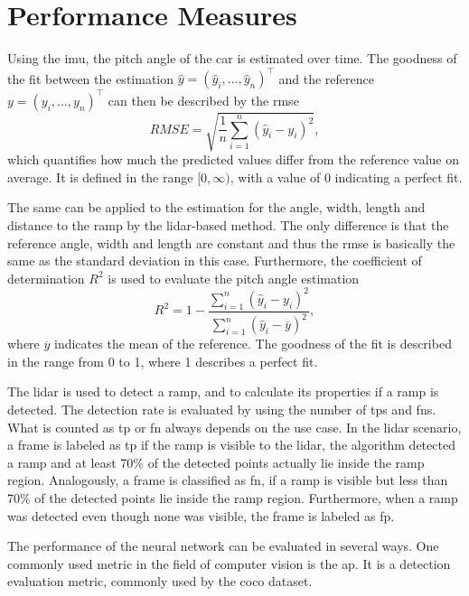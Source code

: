 \section{Performance Measures}
\label{sec:performance_measures}
Using the \gls{imu}, the pitch angle of the car is estimated over time.
The goodness of the fit between the estimation $\hat{y} = (\hat{y}_i, \dots, \hat{y}_n)^\intercal$ and the reference $y = (y_i, \dots, y_n)^\intercal$ can then be described by the \gls{rmse}
\begin{equation}
	RMSE = \sqrt{\frac{1}{n}\sum_{i = 1}^n(\hat{y}_i - y_i)^2},
\end{equation}
which quantifies how much the predicted values differ from the reference value on average.
It is defined in the range $[0, \infty)$, with a value of 0 indicating a perfect fit.\par
The same can be applied to the estimation for the angle, width, length and distance to the ramp by the \gls{lidar}-based method.
The only difference is that the reference angle, width and length are constant and thus the \gls{rmse} is basically the same as the standard deviation in this case.
Furthermore, the coefficient of determination $R^2$ is used to evaluate the pitch angle estimation
\begin{equation}
	R^2 = 1 - \frac{\sum\limits_{i = 1}^n(\hat{y}_i - y_i)^2}{\sum\limits_{i = 1}^n(\hat{y}_i - \overline{y})^2},
\end{equation}
where $\overline{y}$ indicates the mean of the reference.
The goodness of the fit is described in the range from 0 to 1, where 1 describes a perfect fit.\par
The \gls{lidar} is used to detect a ramp, and to calculate its properties if a ramp is detected.
The detection rate is evaluated by using the number of \glspl{tp} and \glspl{fn}.
What is counted as \gls{tp} or \gls{fn} always depends on the use case.
In the \gls{lidar} scenario, a frame is labeled as \gls{tp} if the ramp is visible to the \gls{lidar}, the algorithm detected a ramp and at least 70\% of the detected points actually lie inside the ramp region.
Analogously, a frame is classified as \gls{fn}, if a ramp is visible but less than 70\% of the detected points lie inside the ramp region.
Furthermore, when a ramp was detected even though none was visible, the frame is labeled as \gls{fp}.\par
The performance of the neural network can be evaluated in several ways.
One commonly used metric in the field of computer vision is the \gls{ap}.
It is a detection evaluation metric, commonly used by the \gls{coco} dataset.
